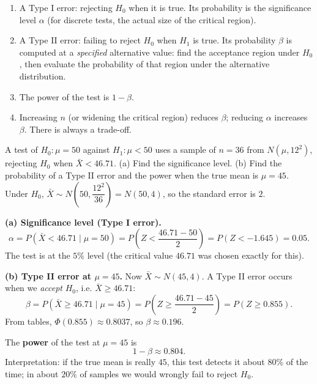 \documentclass[11pt]{article}
\newcommand{\cle}[1]{{\popxbold\color{popdark}#1}}
\newcounter{popsec}
\newcounter{popsub}
\newcommand{\courssub}[1]{%
  \stepcounter{popsub}%
  \par\vspace{9pt}\noindent{\popxbold\fontsize{11.5}{13}\selectfont\color{popink}{\color{poporange}\thepopsec.\thepopsub}\hspace{6pt}#1}\par\nopagebreak\vspace{4pt}
}
\begin{document}
\courssub{Errors and interpretation}

\begin{methode}
\begin{enumerate}
\item A \cle{Type I error}: rejecting $H_0$ when it is true. Its probability is the significance level $\alpha$ (for discrete tests, the actual size of the critical region).
\item A \cle{Type II error}: failing to reject $H_0$ when $H_1$ is true. Its probability $\beta$ is computed at a \emph{specified} alternative value: find the acceptance region under $H_0$, then evaluate the probability of that region under the alternative distribution.
\item The \cle{power} of the test is $1 - \beta$.
\item Increasing $n$ (or widening the critical region) reduces $\beta$; reducing $\alpha$ increases $\beta$. There is always a trade-off.
\end{enumerate}
\end{methode}

\begin{exoresolu}
A test of $H_0 : \mu = 50$ against $H_1 : \mu < 50$ uses a sample of $n = 36$ from $N(\mu, 12^2)$, rejecting $H_0$ when $\bar{X} < 46.71$. (a) Find the significance level. (b) Find the probability of a Type II error and the power when the true mean is $\mu = 45$.
\tcblower
Under $H_0$, $\bar{X} \sim N\!\left(50, \dfrac{12^2}{36}\right) = N(50, 4)$, so the standard error is $2$.

\textbf{(a) Significance level (Type I error).}
\[ \alpha = P(\bar{X} < 46.71 \mid \mu = 50) = P\!\left(Z < \frac{46.71 - 50}{2}\right) = P(Z < -1.645) = 0.05. \]
The test is at the $5\%$ level (the critical value $46.71$ was chosen exactly for this).

\textbf{(b) Type II error at $\mu = 45$.} Now $\bar{X} \sim N(45, 4)$. A Type II error occurs when we \emph{accept} $H_0$, i.e. $\bar{X} \ge 46.71$:
\[ \beta = P(\bar{X} \ge 46.71 \mid \mu = 45) = P\!\left(Z \ge \frac{46.71 - 45}{2}\right) = P(Z \ge 0.855). \]
From tables, $\Phi(0.855) \approx 0.8037$, so $\beta \approx 0.196$.

The \textbf{power} of the test at $\mu = 45$ is
\[ 1 - \beta \approx 0.804. \]
Interpretation: if the true mean is really $45$, this test detects it about $80\%$ of the time; in about $20\%$ of samples we would wrongly fail to reject $H_0$.
\end{exoresolu}
\end{document}
